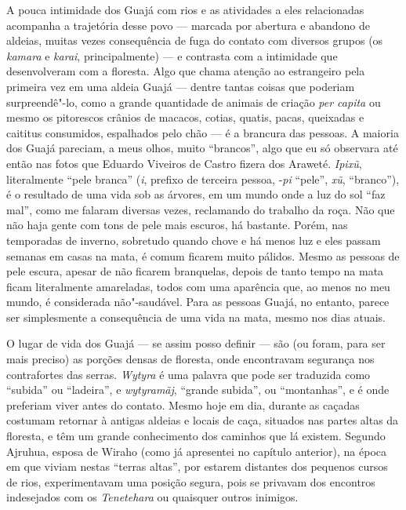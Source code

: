 A pouca intimidade dos Guajá com rios e as atividades a eles
relacionadas acompanha a trajetória desse povo --- marcada por abertura e
abandono de aldeias, muitas vezes consequência de fuga do contato com
diversos grupos (os \emph{kamara} e \emph{karai}, principalmente) --- e
contrasta com a intimidade que desenvolveram com a floresta. Algo que
chama atenção ao estrangeiro pela primeira vez em uma aldeia Guajá ---
dentre tantas coisas que poderiam surpreendê"-lo, como a grande
quantidade de animais de criação \emph{per capita} ou mesmo os
pitorescos crânios de macacos, cotias, quatis, pacas, queixadas e
caititus consumidos, espalhados pelo chão --- é a brancura das pessoas. A
maioria dos Guajá pareciam, a meus olhos, muito ``brancos'', algo que eu
só observara até então nas fotos que Eduardo Viveiros de Castro fizera
dos Araweté. \emph{Ipixũ}, literalmente ``pele branca'' (\emph{i}, prefixo
de terceira pessoa, -\emph{pi} ``pele'', \emph{xũ}, ``branco''), é o
resultado de uma vida sob as árvores, em um mundo onde a luz do sol ``faz
mal'', como me falaram diversas vezes, reclamando do trabalho da roça.
Não que não haja gente com tons de pele mais escuros, há bastante.
Porém, nas temporadas de inverno, sobretudo quando chove e há menos luz
e eles passam semanas em casas na mata, é comum ficarem muito pálidos.
Mesmo as pessoas de pele escura, apesar de não ficarem branquelas,
depois de tanto tempo na mata ficam literalmente amareladas, todos com
uma aparência que, ao menos no meu mundo, é considerada não"-saudável.
Para as pessoas Guajá, no entanto, parece ser simplesmente a
consequência de uma vida na mata, mesmo nos dias atuais.

O lugar de vida dos Guajá --- se assim posso definir --- são (ou foram, para
ser mais preciso) as porções densas de floresta, onde encontravam
segurança nos contrafortes das serras. \emph{Wytyra} é uma palavra que
pode ser traduzida como ``subida'' ou ``ladeira'', e \emph{wytyramãj},
``grande subida'', ou ``montanhas'', e é onde preferiam viver antes do
contato. Mesmo hoje em dia, durante as caçadas costumam retornar à
antigas aldeias e locais de caça, situados nas partes altas da floresta,
e têm um grande conhecimento dos caminhos que lá existem. Segundo
Ajruhua, esposa de Wiraho (como já apresentei no capítulo anterior), na
época em que viviam nestas ``terras altas'', por estarem distantes dos
pequenos cursos de rios, experimentavam uma posição segura, pois se
privavam dos encontros indesejados com os \emph{Tenetehara} ou quaisquer
outros inimigos.


